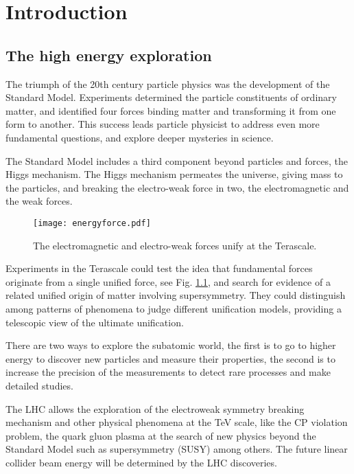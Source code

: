 \chapter{Introduction}
\section{The high energy exploration}
The triumph of the 20th century particle physics was the development of the Standard Model. Experiments determined the particle constituents of ordinary matter, and identified four forces binding matter and transforming it from one form to another. This success leads particle physicist to address even more fundamental questions, and explore deeper mysteries in science.\par
The Standard Model includes a third component beyond particles and forces, the Higgs mechanism. The Higgs mechanism permeates the universe, giving mass to the particles, and breaking the electro-weak force in two, the electromagnetic and the weak forces.\par
\begin{figure}[!hbt]
\centering
\texttt{[image: energyforce.pdf]}\caption{The electromagnetic and electro-weak forces unify at the Terascale.}\label{f:energyforce}
\end{figure}
Experiments in the Terascale could test the idea that fundamental forces originate from a single unified force, see Fig. \ref{f:energyforce}, and search for evidence of a related unified origin of matter involving supersymmetry. They could distinguish among patterns of phenomena to judge different unification models, providing a telescopic view of the ultimate unification.\par
There are two ways to explore the subatomic world, the first is to go to higher energy to discover new particles and measure their properties, the second is to increase the precision of the measurements to detect rare processes and make detailed studies.\par
The LHC allows the exploration of the electroweak symmetry breaking mechanism and other physical phenomena at the TeV scale, like the CP violation problem, the quark gluon plasma at the search of new physics beyond the Standard Model such as supersymmetry (SUSY) among others. The future linear collider beam energy will be determined by the LHC discoveries.\par
